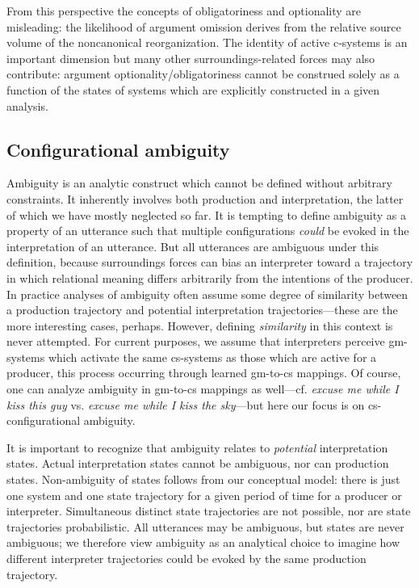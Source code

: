   From this perspective the concepts of obligatoriness and optionality are misleading: the likelihood of argument omission derives from the relative source volume of the noncanonical reorganization. The identity of active c-systems is an important dimension but many other surroundings-related forces may also contribute: argument optionality/obligatoriness cannot be construed solely as a function of the states of systems which are explicitly constructed in a given analysis.

\subsection{Configurational ambiguity}

Ambiguity is an analytic construct which cannot be defined without arbitrary constraints. It inherently  involves both production and interpretation, the latter of which we have mostly neglected so far. It is tempting to define ambiguity as a property of an utterance such that multiple configurations \textit{could} be evoked in the interpretation of an utterance. But all utterances are ambiguous under this definition, because surroundings forces can bias an interpreter toward a trajectory in which relational meaning differs arbitrarily from the intentions of the producer. In practice analyses of ambiguity often assume some degree of similarity between a production trajectory and potential interpretation trajectories—these are the more interesting cases, perhaps. However, defining \textit{similarity} in this context is never attempted. For current purposes, we assume that interpreters perceive gm-systems which activate the same cs-systems as those which are active for a producer, this process occurring through learned gm-to-cs mappings. Of course, one can analyze ambiguity in gm-to-cs mappings as well—cf. \textit{excuse me while I kiss this guy} vs. \textit{excuse me while I kiss the sky}—but here our focus is on cs-configurational ambiguity. 

  It is important to recognize that ambiguity relates to \textit{potential} interpretation states. Actual interpretation states cannot be ambiguous, nor can production states. Non-ambiguity of states follows from our conceptual model: there is just one system and one state trajectory for a given period of time for a producer or interpreter. Simultaneous distinct state trajectories are not possible, nor are state trajectories probabilistic. All utterances may be ambiguous, but states are never ambiguous; we therefore view ambiguity as an analytical choice to imagine how different interpreter trajectories could be evoked by the same production trajectory.

